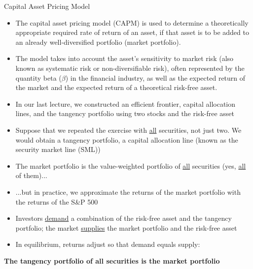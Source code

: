 \documentclass{beamer}
\begin{document}
\begin{frame}
	\begin{center}
		\Huge Capital Asset Pricing Model 
	\end{center}
\end{frame}

\begin{frame}{}
\begin{itemize}
\item The capital asset pricing model (CAPM) is used to determine a theoretically appropriate required rate of return of an asset, {if that asset is to be added to an already well-diversified portfolio (market portfolio)}.
\item The model takes into account the {asset's sensitivity to market risk} (also known as systematic risk or non-diversifiable risk), often represented by the quantity beta ($\beta$) in the financial industry, as well as the expected return of the market and the expected return of a theoretical risk-free asset. 
\end{itemize}
\end{frame}

\begin{frame}{}
	\begin{itemize}
		\item In our last lecture, we constructed an efficient frontier, capital allocation lines, and the tangency portfolio using two stocks and the risk-free asset
		\item Suppose that we repeated the exercise with \underline{all} securities, not just two. We would obtain a tangency portfolio, a capital allocation line (known as the security market line (SML)) 
		\item The market portfolio is the value-weighted portfolio of \underline{all} securities (yes, \underline{all} of them)...
		\item ...but in practice, we approximate the returns of the market portfolio with the returns of the S\&P 500
		\item Investors \underline{demand} a combination of the risk-free asset and the tangency portfolio; the market \underline{supplies} the market portfolio and the risk-free asset
		\item In equilibrium, returns adjust so that demand equals supply: 
	\end{itemize}
	\begin{center}
		\textbf{The tangency portfolio of all securities is the market portfolio }
	\end{center}
\end{frame}
\end{document}
